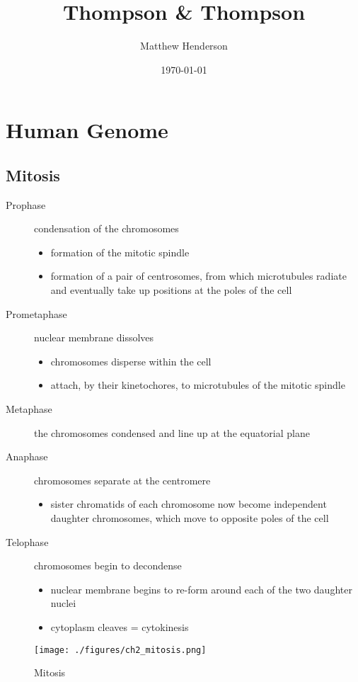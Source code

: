\documentclass[12pt]{scrartcl}
\author{Matthew Henderson}
\date{\today}
\title{Thompson \& Thompson}
\begin{document}
\maketitle
\setcounter{tocdepth}{1}
\tableofcontents


\section{Human Genome}
\label{sec:org1545d66}
\subsection{Mitosis}
\label{sec:orgff149bc}
\begin{description}
\item[{Prophase}] condensation of the chromosomes
\begin{itemize}
\item formation of the mitotic spindle
\item formation of a pair of centrosomes, from which microtubules
radiate and eventually take up positions at the poles of the cell
\end{itemize}
\item[{Prometaphase}] nuclear membrane dissolves
\begin{itemize}
\item chromosomes disperse within the cell
\item attach, by their kinetochores, to microtubules of the mitotic
spindle
\end{itemize}
\item[{Metaphase}] the chromosomes condensed and line up at the equatorial
plane
\item[{Anaphase}] chromosomes separate at the centromere
\begin{itemize}
\item sister chromatids of each chromosome now become independent
daughter chromosomes, which move to opposite poles of the cell
\end{itemize}
\item[{Telophase}] chromosomes begin to decondense
\begin{itemize}
\item nuclear membrane begins to re-form around each of the two daughter
nuclei
\item cytoplasm cleaves = cytokinesis
\end{itemize}
\end{description}

\begin{figure}[htbp]
\centering
\texttt{[image: ./figures/ch2\_mitosis.png]}
\caption{\label{fig:org56c5db8}Mitosis}
\end{figure}
\end{document}
